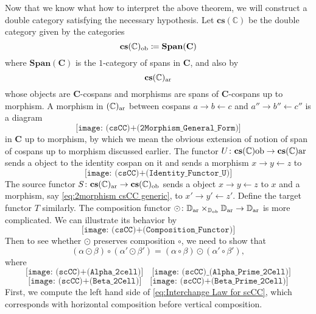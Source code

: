 \documentclass[11pt]{amsart}
\newcommand{\CC}{\mathbb{C}}
\newcommand{\DD}{\mathbb{D}}
\newcommand{\cat}[1]{\mathbf{#1}}
\renewcommand{\t}[1]{\textup{#1}}
\newcommand{\from}{\colon}
\theoremstyle{remark}
\theoremstyle{definition}
\begin{document}
Now that we know what how to interpret the above theorem, we will construct a double category satisfying the necessary hypothesis. Let $\cat{cs}(\CC)$ be the double category given by the categories 
\[
\cat{cs}(\CC)_\t{ob} \coloneqq \cat{Span}(\cat{C})
\] 
where $\cat{Span}(\cat{C})$ is the $1$-category of spans in $\cat{C}$, and also by
\[
\cat{cs}(\CC)_\t{ar}
\]
whose objects are $\cat{C}$-cospans and morphisms are spans of $\cat{C}$-cospans up to morphism. A morphism in $(\CC)_\t{ar}$ between cospans $a \to b \gets c$ and $a'' \to b'' \gets c''$ is a diagram
\begin{equation}
\label{eq:2morphism csCC generic}
\texttt{[image: (csCC)+(2Morphism\_General\_Form)]}
\end{equation}
in $\cat{C}$ up to morphism, by which we mean the obvious extension of notion of span of cospans up to morphism discussed earlier.  The functor $U \from \cat{cs}(\CC)\t{ob} \to \cat{cs}(\CC)\t{ar}$ sends a object to the identity cospan on it and sends a morphism $x \to y \gets z$ to 
\[
\texttt{[image: (csCC)+(Identity\_Functor\_U)]}
\]
The source functor $S \from \cat{cs}(\CC)_\t{ar} \to \cat{cs}(\CC)_\t{ob}$ sends a object $x \to y \gets z$ to $x$ and a morphism, say \eqref{eq:2morphism csCC generic}, to $x' \to y' \gets z'$.  Define the target functor $T$ similarly.  The composition functor $\odot \from \DD_\t{ar} \times_{\DD_\t{ob}} \DD_\t{ar} \to \DD_\t{ar}$ is more complicated.  We can illustrate its behavior by
\[
\texttt{[image: (csCC)+(Composition\_Functor)]}
\]
Then to see whether $\odot$ preserves composition $\circ$, we need to show that 
\begin{equation}
\label{eq:Interchange Law for scCC}
(\alpha \odot \beta) \circ (\alpha' \odot \beta') = (\alpha \circ \beta) \odot (\alpha' \circ \beta'),
\end{equation} 
where
\[
\texttt{[image: (scCC)+(Alpha\_2cell)]}
\quad
\texttt{[image: (scCC)\_(Alpha\_Prime\_2Cell)]}
\]
\[
\texttt{[image: (scCC)+(Beta\_2Cell)]}
\quad
\texttt{[image: (scCC)+(Beta\_Prime\_2Cell)]}
\]
First, we compute the left hand side of \eqref{eq:Interchange Law for scCC}, which corresponds with horizontal composition before vertical composition. 



%
%
\end{document}
